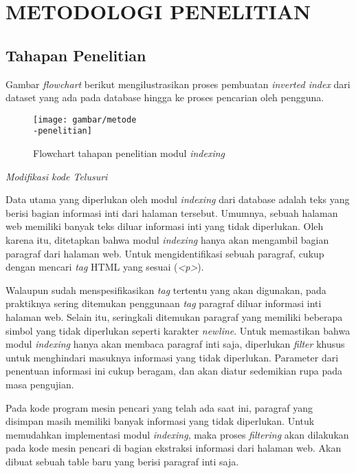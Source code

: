 
\chapter{METODOLOGI PENELITIAN}

\section{Tahapan Penelitian}

Gambar \textit{flowchart} berikut mengilustrasikan proses pembuatan \textit{
inverted index} dari dataset yang ada pada database hingga ke proses pencarian
oleh pengguna.

\begin{figure}[H]
  \centering{}
	\texttt{[image: gambar/metode\\-penelitian]}
  \caption{Flowchart tahapan penelitian modul \textit{indexing}}
\end{figure}

\textit{Modifikasi kode \textit{Telusuri}}

Data utama yang diperlukan oleh modul \textit{indexing} dari database adalah
teks yang berisi bagian informasi inti dari halaman tersebut. Umumnya, sebuah
halaman web memiliki banyak teks diluar informasi inti yang tidak diperlukan.
Oleh karena itu, ditetapkan bahwa modul \textit{indexing} hanya akan mengambil
bagian paragraf dari halaman web. Untuk mengidentifikasi sebuah paragraf, cukup
dengan mencari \textit{tag} HTML yang sesuai (\textit{<p>}).

Walaupun sudah menspesifikasikan \textit{tag} tertentu yang akan digunakan, pada
praktiknya sering ditemukan penggunaan \textit{tag} paragraf diluar informasi
inti halaman web. Selain itu, seringkali ditemukan paragraf yang memiliki
beberapa simbol yang tidak diperlukan seperti karakter \textit{newline}. Untuk
memastikan bahwa modul \textit{indexing} hanya akan membaca paragraf inti saja,
diperlukan \textit{filter} khusus untuk menghindari masuknya informasi yang
tidak diperlukan. Parameter dari penentuan informasi ini cukup beragam, dan akan
diatur sedemikian rupa pada masa pengujian.

Pada kode program mesin pencari yang telah ada saat ini, paragraf yang disimpan
masih memiliki banyak informasi yang tidak diperlukan. Untuk memudahkan
implementasi modul \textit{indexing}, maka proses \textit{filtering} akan
dilakukan pada kode mesin pencari di bagian ekstraksi informasi dari halaman
web. Akan dibuat sebuah table baru yang berisi paragraf inti saja.


